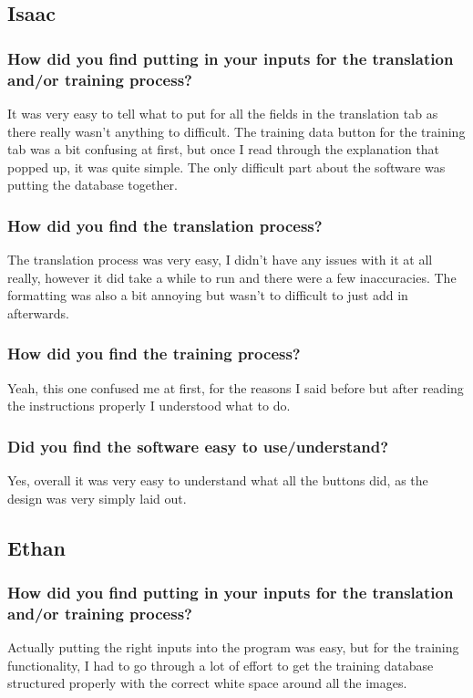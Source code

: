 \documentclass{report}
\begin{document}
\subsection{Isaac}
\subsubsection{How did you find putting in your inputs for the translation and/or training process?}
It was very easy to tell what to put for all the fields in the translation tab as there really wasn't anything to difficult. The training data button for the training tab was a bit confusing at first, but once I read through the explanation that popped up, it was quite simple. The only difficult part about the software was putting the database together.
\subsubsection{How did you find the translation process?}
The translation process was very easy, I didn't have any issues with it at all really, however it did take a while to run and there were a few inaccuracies. The formatting was also a bit annoying but wasn't to difficult to just add in afterwards.
\subsubsection{How did you find the training process?}
Yeah, this one confused me at first, for the reasons I said before but after reading the instructions properly I understood what to do.
\subsubsection{Did you find the software easy to use/understand?}
Yes, overall it was very easy to understand what all the buttons did, as the design was very simply laid out.
\subsection{Ethan}
\subsubsection{How did you find putting in your inputs for the translation and/or training process?}
Actually putting the right inputs into the program was easy, but for the training functionality, I had to go through a lot of effort to get the training database structured properly with the correct white space around all the images.
\end{document}
